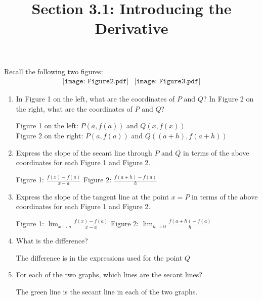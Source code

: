\documentclass[nooutcomes, handout]{ximera}
\title{Section 3.1: Introducing the Derivative}
\begin{document}
\begin{abstract}		\end{abstract}
\maketitle

\begin{problem}
 Recall the following two figures:
  \[
    \begin{array}{lr}
      \texttt{[image: Figure2.pdf]} &		   \texttt{[image: Figure3.pdf]}
    \end{array}
  \]
  \begin{enumerate}
    \item
      In Figure 1 on the left, what are the coordinates of $P$ and $Q$?  In Figure 2 on the right, what are the coordinates of $P$ and $Q$?

	\begin{freeResponse}
	Figure 1 on the left: $P(a,f(a))$ and $Q(x,f(x))$ \\
	Figure 2 on the right: $P(a,f(a))$ and $Q((a+h),f(a+h))$

	\end{freeResponse}

	\item Express the slope of the secant line through $P$ and $Q$ in terms of the above coordinates for each Figure 1 and Figure 2.

      \begin{freeResponse}
	Figure 1: $\frac{f(x)-f(a)}{x-a}$ 
	Figure 2: $\frac{f(a+h)-f(a)}{h}$
        \end{freeResponse}
	
	\item
	Express the slope of the tangent line at the point $x=P$ in terms of the above coordinates for each Figure 1 and Figure 2.

	\begin{freeResponse}
        	Figure 1:  $ \lim_{x \to a} \frac{f(x)-f(a)}{x-a}$
	Figure 2: $\lim_{h \to 0} \frac{f(a+h)-f(a)}{h}$
      \end{freeResponse}

    \item 
      What is the difference?
      \begin{freeResponse}
	The difference is in the expressions used for the point $Q$
      \end{freeResponse}


    \item 
      For each of the two graphs, which lines are the secant lines?
      \begin{freeResponse}
        The green line is the secant line in each of the two graphs.        
      \end{freeResponse}


\end{enumerate}
\end{problem}
\end{document}
